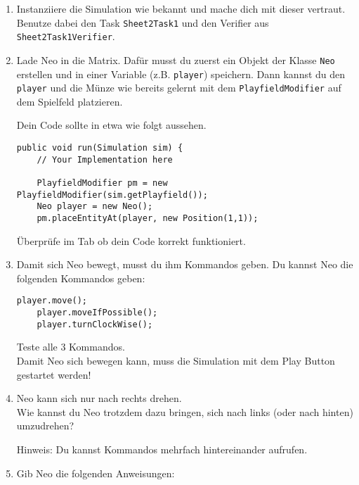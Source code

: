 



\begin{enumerate}
    \item Instanziiere die Simulation wie bekannt und mache dich mit dieser vertraut. 
        Benutze dabei den Task \lstinline{Sheet2Task1} und den Verifier aus \lstinline{Sheet2Task1Verifier}.
    \item Lade Neo in die Matrix.
        Dafür musst du zuerst ein Objekt der Klasse \lstinline{Neo} erstellen und in einer Variable (z.B. \lstinline{player}) speichern.
        Dann kannst du den \lstinline{player} und die Münze wie bereits gelernt mit dem \lstinline{PlayfieldModifier} auf dem Spielfeld platzieren.

        Dein Code sollte in etwa wie folgt aussehen.

        \begin{lstlisting}[firstnumber=14]
public void run(Simulation sim) {
    // Your Implementation here

    PlayfieldModifier pm = new PlayfieldModifier(sim.getPlayfield());
    Neo player = new Neo();
    pm.placeEntityAt(player, new Position(1,1));
        \end{lstlisting}

        Überprüfe im  Tab ob dein Code korrekt funktioniert.
    \item Damit sich Neo bewegt, musst du ihm Kommandos geben.
        Du kannst Neo die folgenden Kommandos geben:

        \begin{lstlisting}[firstnumber=20]
    player.move();
    player.moveIfPossible();
    player.turnClockWise();
        \end{lstlisting}

        Teste alle 3 Kommandos.\\
        Damit Neo sich bewegen kann, muss die Simulation mit dem Play Button gestartet werden!
    \item Neo kann sich nur nach rechts drehen.\\
        Wie kannst du Neo trotzdem dazu bringen, sich nach links (oder nach hinten) umzudrehen?

        Hinweis: Du kannst Kommandos mehrfach hintereinander aufrufen.
    \item Gib Neo die folgenden Anweisungen:
        

\end{enumerate}
